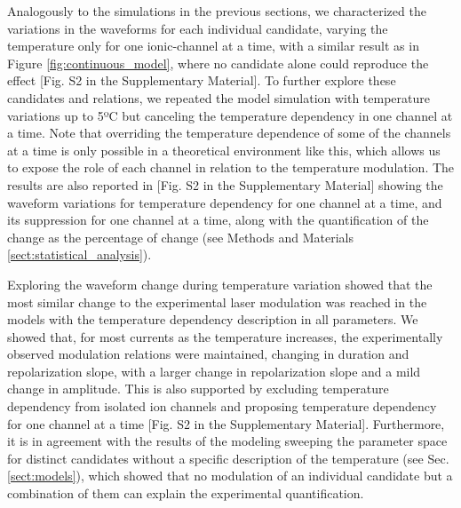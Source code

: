 Analogously to the simulations in the previous sections, we characterized the variations in the waveforms for each individual candidate, varying the temperature only for one ionic-channel at a time, with a similar result as in Figure \ref{fig:continuous_model}, where no candidate alone could reproduce the effect [Fig. S2 in the Supplementary Material]. To further explore these candidates and relations, we repeated the model simulation with temperature variations up to 5ºC but canceling the temperature dependency in one channel at a time. Note that overriding the temperature dependence of some of the channels at a time is only possible in a theoretical environment like this, which allows us to expose the role of each channel in relation to the temperature modulation. The results are also reported in [Fig. S2 in the Supplementary Material] showing the waveform variations for temperature dependency for one channel at a time, and its suppression for one channel at a time, along with the quantification of the change as the percentage of change (see Methods and Materials \ref{sect:statistical_analysis}). 

Exploring the waveform change during temperature variation showed that the most similar change to the experimental laser modulation was reached in the models with the temperature dependency description in all parameters. We showed that, for most currents as the temperature increases, the experimentally observed modulation relations were maintained, changing in duration and repolarization slope, with a larger change in repolarization slope and a mild change in amplitude. This is also supported by excluding temperature dependency from isolated ion channels and proposing temperature dependency for one channel at a time [Fig. S2 in the Supplementary Material]. Furthermore, it is in agreement with the results of the modeling sweeping the parameter space for distinct candidates without a specific description of the temperature (see Sec. \ref{sect:models}), which showed that no modulation of an individual candidate but a combination of them can explain the experimental quantification.



